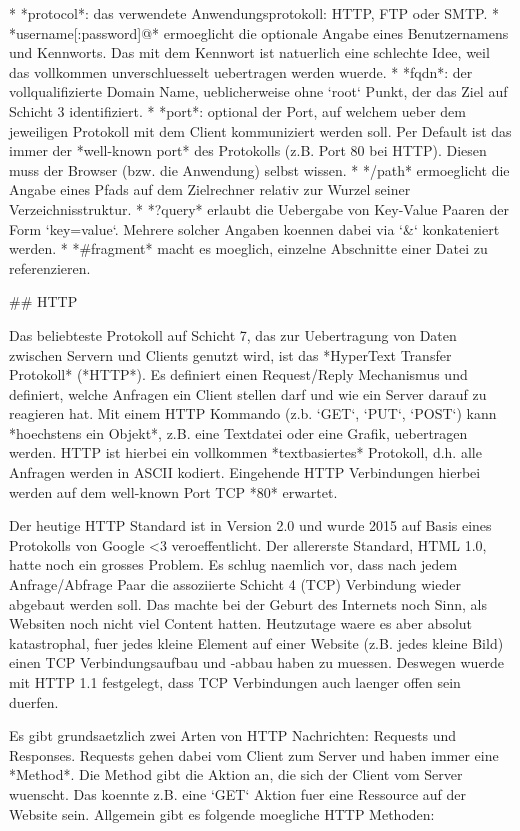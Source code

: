 * *protocol*: das verwendete Anwendungsprotokoll: HTTP, FTP oder SMTP.
* *username[:password]@* ermoeglicht die optionale Angabe eines Benutzernamens
  und Kennworts. Das mit dem Kennwort ist natuerlich eine schlechte Idee, weil
  das vollkommen unverschluesselt uebertragen werden wuerde.
* *fqdn*: der vollqualifizierte Domain Name, ueblicherweise ohne `root` Punkt,
  der das Ziel auf Schicht 3 identifiziert.
* *port*: optional der Port, auf welchem ueber dem jeweiligen Protokoll mit dem
  Client kommuniziert werden soll. Per Default ist das immer der
  *well-known port* des Protokolls (z.B. Port 80 bei HTTP). Diesen muss der
  Browser (bzw. die Anwendung) selbst wissen.
* */path* ermoeglicht die Angabe eines Pfads auf dem Zielrechner relativ zur
  Wurzel seiner Verzeichnisstruktur.
* *?query* erlaubt die Uebergabe von Key-Value Paaren der Form
  `key=value`. Mehrere solcher Angaben koennen dabei via `&` konkateniert
  werden.
* *#fragment* macht es moeglich, einzelne Abschnitte einer Datei zu
  referenzieren.

## HTTP

Das beliebteste Protokoll auf Schicht 7, das zur Uebertragung von Daten zwischen
Servern und Clients genutzt wird, ist das *HyperText Transfer Protokoll*
(*HTTP*). Es definiert einen Request/Reply Mechanismus und definiert, welche
Anfragen ein Client stellen darf und wie ein Server darauf zu reagieren hat. Mit
einem HTTP Kommando (z.b. `GET`, `PUT`, `POST`) kann *hoechstens ein Objekt*,
z.B. eine Textdatei oder eine Grafik, uebertragen werden. HTTP ist hierbei ein
vollkommen *textbasiertes* Protokoll, d.h. alle Anfragen werden in ASCII
kodiert. Eingehende HTTP Verbindungen hierbei werden auf dem well-known Port TCP
*80* erwartet.

Der heutige HTTP Standard ist in Version 2.0 und wurde 2015 auf Basis eines
Protokolls von Google <3 veroeffentlicht. Der allererste Standard, HTML 1.0,
hatte noch ein grosses Problem. Es schlug naemlich vor, dass nach jedem
Anfrage/Abfrage Paar die assoziierte Schicht 4 (TCP) Verbindung wieder abgebaut
werden soll. Das machte bei der Geburt des Internets noch Sinn, als Websiten
noch nicht viel Content hatten. Heutzutage waere es aber absolut katastrophal,
fuer jedes kleine Element auf einer Website (z.B. jedes kleine Bild) einen TCP
Verbindungsaufbau und -abbau haben zu muessen. Deswegen wuerde mit HTTP 1.1
festgelegt, dass TCP Verbindungen auch laenger offen sein duerfen.

Es gibt grundsaetzlich zwei Arten von HTTP Nachrichten: Requests und
Responses. Requests gehen dabei vom Client zum Server und haben immer eine
*Method*. Die Method gibt die Aktion an, die sich der Client vom Server
wuenscht. Das koennte z.B. eine `GET` Aktion fuer eine Ressource auf der Website
sein. Allgemein gibt es folgende moegliche HTTP Methoden:

